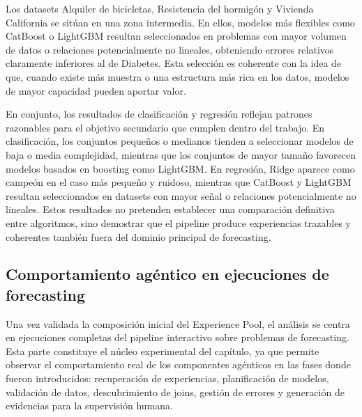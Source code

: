 \documentclass[12pt,a4paper]{article}
\theoremstyle{plain}
\begin{document}
Los datasets Alquiler de bicicletas, Resistencia del hormigón y Vivienda California se sitúan en una zona intermedia. En ellos, modelos más flexibles como CatBoost o LightGBM resultan seleccionados en problemas con mayor volumen de datos o relaciones potencialmente no lineales, obteniendo errores relativos claramente inferiores al de Diabetes. Esta selección es coherente con la idea de que, cuando existe más muestra o una estructura más rica en los datos, modelos de mayor capacidad pueden aportar valor.

En conjunto, los resultados de clasificación y regresión reflejan patrones razonables para el objetivo secundario que cumplen dentro del trabajo. En clasificación, los conjuntos pequeños o medianos tienden a seleccionar modelos de baja o media complejidad, mientras que los conjuntos de mayor tamaño favorecen modelos basados en boosting como LightGBM. En regresión, Ridge aparece como campeón en el caso más pequeño y ruidoso, mientras que CatBoost y LightGBM resultan seleccionados en datasets con mayor señal o relaciones potencialmente no lineales. Estos resultados no pretenden establecer una comparación definitiva entre algoritmos, sino demostrar que el pipeline produce experiencias trazables y coherentes también fuera del dominio principal de forecasting.

\subsection{Comportamiento agéntico en ejecuciones de forecasting}
\label{sec:casos-estudio-forecasting}

Una vez validada la composición inicial del Experience Pool, el análisis se centra en ejecuciones completas del pipeline interactivo sobre problemas de forecasting. Esta parte constituye el núcleo experimental del capítulo, ya que permite observar el comportamiento real de los componentes agénticos en las fases donde fueron introducidos: recuperación de experiencias, planificación de modelos, validación de datos, descubrimiento de joins, gestión de errores y generación de evidencias para la supervisión humana.
\end{document}
